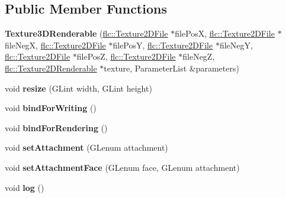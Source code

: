 \subsection*{Public Member Functions}
\begin{DoxyCompactItemize}
\item 
{\bfseries Texture3\+D\+Renderable} (\hyperlink{classflw_1_1flc_1_1Texture2DFile}{flc\+::\+Texture2\+D\+File} $\ast$file\+PosX, \hyperlink{classflw_1_1flc_1_1Texture2DFile}{flc\+::\+Texture2\+D\+File} $\ast$file\+NegX, \hyperlink{classflw_1_1flc_1_1Texture2DFile}{flc\+::\+Texture2\+D\+File} $\ast$file\+PosY, \hyperlink{classflw_1_1flc_1_1Texture2DFile}{flc\+::\+Texture2\+D\+File} $\ast$file\+NegY, \hyperlink{classflw_1_1flc_1_1Texture2DFile}{flc\+::\+Texture2\+D\+File} $\ast$file\+PosZ, \hyperlink{classflw_1_1flc_1_1Texture2DFile}{flc\+::\+Texture2\+D\+File} $\ast$file\+NegZ, \hyperlink{classflw_1_1flc_1_1Texture2DRenderable}{flc\+::\+Texture2\+D\+Renderable} $\ast$texture, Parameter\+List \&parameters)\hypertarget{classflw_1_1flc_1_1Texture3DRenderable_ae4670b111fb0c286093a40bcb8244aec}{}\label{classflw_1_1flc_1_1Texture3DRenderable_ae4670b111fb0c286093a40bcb8244aec}

\item 
void {\bfseries resize} (G\+Lint width, G\+Lint height)\hypertarget{classflw_1_1flc_1_1Texture3DRenderable_af26f145c0e83c1a688c2f2eceb19f857}{}\label{classflw_1_1flc_1_1Texture3DRenderable_af26f145c0e83c1a688c2f2eceb19f857}

\item 
void {\bfseries bind\+For\+Writing} ()\hypertarget{classflw_1_1flc_1_1Texture3DRenderable_adfc4215e26cc4f35b6245d6c3acb1b64}{}\label{classflw_1_1flc_1_1Texture3DRenderable_adfc4215e26cc4f35b6245d6c3acb1b64}

\item 
void {\bfseries bind\+For\+Rendering} ()\hypertarget{classflw_1_1flc_1_1Texture3DRenderable_a6d62a726b2bae4266c4d3505f7ff6096}{}\label{classflw_1_1flc_1_1Texture3DRenderable_a6d62a726b2bae4266c4d3505f7ff6096}

\item 
void {\bfseries set\+Attachment} (G\+Lenum attachment)\hypertarget{classflw_1_1flc_1_1Texture3DRenderable_af87908f03644612c6bc128c8c5855ee4}{}\label{classflw_1_1flc_1_1Texture3DRenderable_af87908f03644612c6bc128c8c5855ee4}

\item 
void {\bfseries set\+Attachment\+Face} (G\+Lenum face, G\+Lenum attachment)\hypertarget{classflw_1_1flc_1_1Texture3DRenderable_a5ffda802984116afbaa6c23baa8ccf61}{}\label{classflw_1_1flc_1_1Texture3DRenderable_a5ffda802984116afbaa6c23baa8ccf61}

\item 
void {\bfseries log} ()\hypertarget{classflw_1_1flc_1_1Texture3DRenderable_ac9082f536d5485c04cf1c2b765ec6c1f}{}\label{classflw_1_1flc_1_1Texture3DRenderable_ac9082f536d5485c04cf1c2b765ec6c1f}

\end{DoxyCompactItemize}
